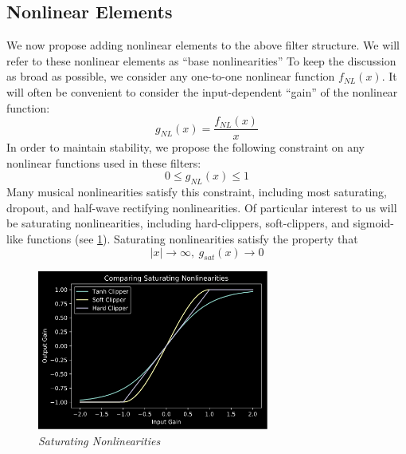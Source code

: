 \documentclass[twoside,a4paper]{article}
\begin{document}
\subsection{Nonlinear Elements}
%
We now propose adding nonlinear elements to the above filter structure.
We will refer to these nonlinear elements as ``base nonlinearities''
To keep the discussion as broad as possible, we consider any one-to-one
nonlinear function $f_{NL}(x)$. It will often be convenient to consider
the input-dependent ``gain'' of the nonlinear function:
%
\begin{equation}
    g_{NL}(x) = \frac{f_{NL}(x)}{x}
    \label{eq:g_NL}
\end{equation}
%
In order to maintain stability, we propose the following constraint on
any nonlinear functions used in these filters:
%
\begin{equation}
    0 \leq g_{NL}(x)\leq 1
    \label{eq:NL_constraint}
\end{equation}
%
Many musical nonlinearities satisfy this constraint, including most
saturating, dropout, and half-wave rectifying nonlinearities.
Of particular interest to us will be saturating nonlinearities,
including hard-clippers, soft-clippers, and sigmoid-like functions
(see \cref{Sats}).
Saturating nonlinearities satisfy the property that
%
\begin{equation}
    |x| \rightarrow \infty, \ g_{sat}(x) \rightarrow 0
    \label{eq:Sat_constraint}
\end{equation}
%
\begin{figure}[ht]
    \center
    \includegraphics[width=3in]{../Pics/Sat-NLs.png}
    \caption{\label{Sats}{\it Saturating Nonlinearities}}
\end{figure}
%
\end{document}
